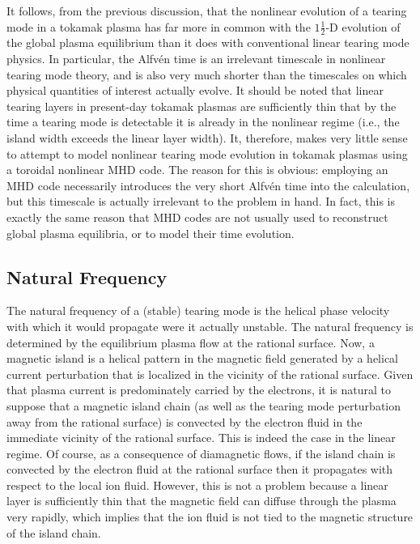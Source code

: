 \documentclass[12pt,prb,aps]{revtex4-1}
\begin{document}
It follows, from the previous discussion, that the nonlinear evolution of a tearing mode in a tokamak plasma has far more in common with the $1\tfrac{1}{2}$-D
evolution of the global plasma equilibrium than it does with
conventional linear tearing mode physics. In particular, the Alfv\'{e}n time is
an irrelevant timescale in nonlinear tearing mode theory, and
is also  very much shorter than the timescales on which
physical quantities of interest actually evolve. It should be noted that linear tearing layers in present-day tokamak plasmas are sufficiently thin that by the time a tearing mode is detectable it is already in the nonlinear regime (i.e., the island width exceeds the linear layer width).\cite{wesson} It, therefore, makes very little sense to
attempt to model nonlinear tearing mode evolution in tokamak plasmas using a toroidal nonlinear MHD code. The reason for this is obvious: employing  an MHD code necessarily introduces the very short Alfv\'{e}n time into the calculation,
but this timescale is actually irrelevant to the problem in hand. In fact, this is exactly the same reason that MHD codes are not usually used to reconstruct global plasma equilibria, or to model their time evolution.

\subsection{Natural Frequency}\label{natural}
The natural frequency of a (stable) tearing mode is
the helical phase velocity with which it would propagate
were it actually unstable.\cite{rfa} The natural frequency
is determined by the equilibrium plasma flow at the
rational surface. Now, a magnetic island is a helical
pattern in the magnetic field  generated by a helical current perturbation that is localized in the
vicinity of the rational surface.
Given that plasma current is predominately carried by the
electrons, it is natural to suppose that a magnetic
island chain (as well as the tearing mode perturbation
away from the rational surface)  is convected by the
electron fluid in the immediate vicinity of the rational
surface. This is indeed the case in the linear regime.\cite{ara} Of course, as a consequence of diamagnetic flows, if the island chain is
convected by the electron fluid at the rational surface then it propagates with respect to the local ion fluid. However, this is not a
problem because a linear layer is sufficiently thin that the magnetic field can diffuse through the plasma very rapidly, which implies that
the ion fluid is not tied to the magnetic structure of the island chain. 
\end{document}
